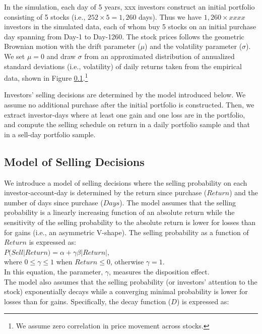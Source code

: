 \documentclass[11pt, a4paper]{article}
\begin{document}
In the simulation, each day of 5 years, xxx investors construct an initial portfolio consisting of 5 stocks (i.e., $252\times5=1,260$ days). Thus we have $1,260\times xxxx$ investors in the simulated data, each of whom buy 5 stocks on an initial purchase day spanning from Day-1 to Day-1260. The stock prices follows the geometric Brownian motion with the drift parameter ($\mu$) and the volatility parameter ($\sigma$). We set $\mu=0$ and draw $\sigma$ from an approximated distribution of annualized standard deviations (i.e., volatility) of daily returns taken from the empirical data, shown in Figure \ref{}.\footnote{We assume zero correlation in price movement across stocks.}

Investors' selling decisions are determined by the model introduced below. We assume no additional purchase after the initial portfolio is constructed. Then, we extract investor-days where at least one gain and one loss are in the portfolio, and compute the selling schedule on return in a daily portfolio sample and that in a sell-day portfolio sample.


\subsection{Model of Selling Decisions}
We introduce a model of selling decisions where the selling probability on each investor-account-day is determined by the return since purchase ($Return$) and the number of days since purchase ($Days$). The model assumes that the selling probability is a linearly increasing function of an absolute return while the sensitivity of the selling probability to the absolute return is lower for losses than for gains (i.e., an asymmetric V-shape). The selling probability as a function of $Return$ is expressed as:\\

\noindent
$P(Sell|Return)=\alpha+\gamma \beta  |Return|$, \\
where $0\leq \gamma \leq 1$ when $Return\leq 0$, otherwise $\gamma=1$. \\
In this equation, the parameter, $\gamma$, measures the disposition effect.\\

The model also assumes that the selling probability (or investors' attention to the stock) exponentially decays while a converging minimal probability is lower for losses than for gains. Specifically, the decay function ($D$) is expressed as:\\
\end{document}
